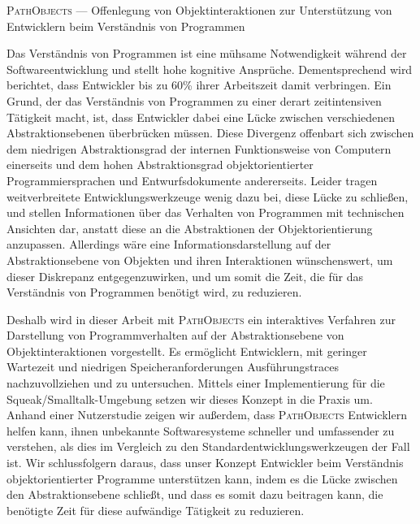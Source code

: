 \begin{minipage}[t]{\textwidth}

	\setlength{\parindent}{0pt}
	\setlength{\parskip}{1ex plus 0.5ex minus 0.2ex}

\begin{flushleft}
{\Large \textsc{PathObjects} --- Offenlegung von Objektinteraktionen zur Unterstützung von Entwicklern beim Verständnis von Programmen}
\end{flushleft}

Das Verständnis von Programmen ist eine mühsame Notwendigkeit während der Softwareentwicklung und stellt hohe kognitive Ansprüche.
Dementsprechend wird berichtet, dass Entwickler bis zu 60\% ihrer Arbeitszeit damit verbringen.
Ein Grund, der das Verständnis von Programmen zu einer derart zeitintensiven Tätigkeit macht, ist, dass Entwickler dabei eine Lücke zwischen verschiedenen Abstraktionsebenen überbrücken müssen.
Diese Divergenz offenbart sich zwischen dem niedrigen Abstraktionsgrad der internen Funktionsweise von Computern einerseits und dem hohen Abstraktionsgrad objektorientierter Programmiersprachen und Entwurfsdokumente andererseits.
Leider tragen weitverbreitete Entwicklungswerkzeuge wenig dazu bei, diese Lücke zu schließen, und stellen Informationen über das Verhalten von Programmen mit technischen Ansichten dar, anstatt diese an die Abstraktionen der Objektorientierung anzupassen.
Allerdings wäre eine Informationsdarstellung auf der Abstraktionsebene von Objekten und ihren Interaktionen wünschenswert, um dieser Diskrepanz entgegenzuwirken, und um somit die Zeit, die für das Verständnis von Programmen benötigt wird, zu reduzieren.

Deshalb wird in dieser Arbeit mit \textsc{PathObjects} ein interaktives Verfahren zur Darstellung von Programmverhalten auf der Abstraktionsebene von Objektinteraktionen vorgestellt.
Es ermöglicht Entwicklern, mit geringer Wartezeit und niedrigen Speicheranforderungen Ausführungstraces nachzuvollziehen und zu untersuchen.
Mittels einer Implementierung für die Squeak/Smalltalk-Umgebung setzen wir dieses Konzept in die Praxis um.
Anhand einer Nutzerstudie zeigen wir außerdem, dass \textsc{PathObjects} Entwicklern helfen kann, ihnen unbekannte Softwaresysteme schneller und umfassender zu verstehen, als dies im Vergleich zu den Standardentwicklungswerkzeugen der Fall ist.
Wir schlussfolgern daraus, dass unser Konzept Entwickler beim Verständnis objektorientierter Programme unterstützen kann, indem es die Lücke zwischen den Abstraktionsebene schließt, und dass es somit dazu beitragen kann, die benötigte Zeit für diese aufwändige Tätigkeit zu reduzieren.

\end{minipage}

